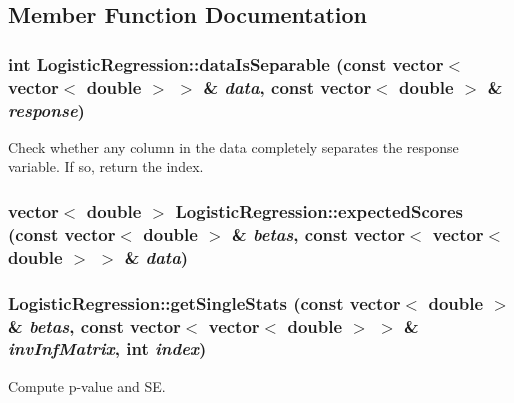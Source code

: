 \subsection{Member Function Documentation}
\hypertarget{classLogisticRegression_a7de2efb78e07f9b46f34f8627fe8dae7}{
\subsubsection[{dataIsSeparable}]{\setlength{\rightskip}{0pt plus 5cm}int LogisticRegression::dataIsSeparable (const vector$<$ vector$<$ double $>$ $>$ \& {\em data}, \/  const vector$<$ double $>$ \& {\em response})}}
\label{classLogisticRegression_a7de2efb78e07f9b46f34f8627fe8dae7}
Check whether any column in the data completely separates the response variable. If so, return the index. \hypertarget{classLogisticRegression_a8a7966506c2677d7426be408a7cb3f02}{
\subsubsection[{expectedScores}]{\setlength{\rightskip}{0pt plus 5cm}vector$<$ double $>$ LogisticRegression::expectedScores (const vector$<$ double $>$ \& {\em betas}, \/  const vector$<$ vector$<$ double $>$ $>$ \& {\em data})}}
\label{classLogisticRegression_a8a7966506c2677d7426be408a7cb3f02}
\hypertarget{classLogisticRegression_aae7d62475729b5b670759d24ea1a35ff}{
\subsubsection[{getSingleStats}]{ LogisticRegression::getSingleStats (const vector$<$ double $>$ \& {\em betas}, \/  const vector$<$ vector$<$ double $>$ $>$ \& {\em invInfMatrix}, \/  int {\em index})}}
\label{classLogisticRegression_aae7d62475729b5b670759d24ea1a35ff}
Compute p-\/value and SE.

